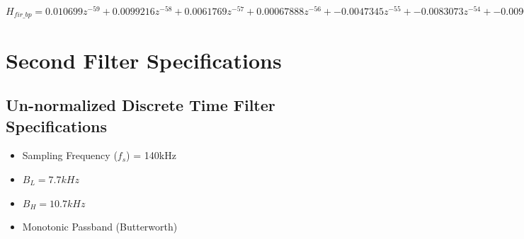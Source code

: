 \documentclass[22pt]{article}
\begin{document}
$H_{fir\_bp} = 0.010699z^{-59} +0.0099216z^{-58} +0.0061769z^{-57} +0.00067888z^{-56} +-0.0047345z^{-55} +-0.0083073z^{-54} +-0.0090412z^{-53} +-0.0070586z^{-52} +-0.0035005z^{-51} +1.5549e-17z^{-50} +0.0020437z^{-49} +0.0020753z^{-48} +0.0006074z^{-47} +-0.0010474z^{-46} +-0.0014292z^{-45} +0.00031922z^{-44} +0.0039434z^{-43} +0.0080615z^{-42} +0.010683z^{-41} +0.010067z^{-40} +0.0055652z^{-39} +-0.0019308z^{-38} +-0.010166z^{-37} +-0.016293z^{-36} +-0.017965z^{-35} +-0.014297z^{-34} +-0.0062993z^{-33} +0.0034278z^{-32} +0.011658z^{-31} +0.015779z^{-30} +0.014805z^{-29} +0.009742z^{-28} +0.0031172z^{-27} +-0.0021396z^{-26} +-0.0040068z^{-25} +-0.0023031z^{-24} +0.0011925z^{-23} +0.003537z^{-22} +0.0020435z^{-21} +-0.0042678z^{-20} +-0.013846z^{-19} +-0.022858z^{-18} +-0.026534z^{-17} +-0.021167z^{-16} +-0.0059818z^{-15} +0.01592z^{-14} +0.038073z^{-13} +0.05258z^{-12} +0.052901z^{-11} +0.036481z^{-10} +0.0062323z^{-9} +-0.029837z^{-8} +-0.060854z^{-7} +-0.07654z^{-6} +-0.070733z^{-5} +-0.04374z^{-4} +-0.0026197z^{-3} +0.040796z^{-2} +0.073555z^{-1} +0.085714z^{0} +0.073555z^{1} +0.040796z^{2} +-0.0026197z^{3} +-0.04374z^{4} +-0.070733z^{5} +-0.07654z^{6} +-0.060854z^{7} +-0.029837z^{8} +0.0062323z^{9} +0.036481z^{10} +0.052901z^{11} +0.05258z^{12} +0.038073z^{13} +0.01592z^{14} +-0.0059818z^{15} +-0.021167z^{16} +-0.026534z^{17} +-0.022858z^{18} +-0.013846z^{19} +-0.0042678z^{20} +0.0020435z^{21} +0.003537z^{22} +0.0011925z^{23} +-0.0023031z^{24} +-0.0040068z^{25} +-0.0021396z^{26} +0.0031172z^{27} +0.009742z^{28} +0.014805z^{29} +0.015779z^{30} +0.011658z^{31} +0.0034278z^{32} +-0.0062993z^{33} +-0.014297z^{34} +-0.017965z^{35} +-0.016293z^{36} +-0.010166z^{37} +-0.0019308z^{38} +0.0055652z^{39} +0.010067z^{40} +0.010683z^{41} +0.0080615z^{42} +0.0039434z^{43} +0.00031922z^{44} +-0.0014292z^{45} +-0.0010474z^{46} +0.0006074z^{47} +0.0020753z^{48} +0.0020437z^{49} +1.5549e-17z^{50} +-0.0035005z^{51} +-0.0070586z^{52} +-0.0090412z^{53} +-0.0083073z^{54} +-0.0047345z^{55} +0.00067888z^{56} +0.0061769z^{57} +0.0099216z^{58} +0.010699z^{59}$



\section{Second Filter Specifications}
\subsection{Un-normalized Discrete Time Filter Specifications}
\begin{itemize}
\item Sampling Frequency ($f_s$) = 140kHz
\item $B_L = 7.7 kHz$
\item $B_H = 10.7 kHz$
\item Monotonic Passband (Butterworth)
\end{itemize}
\end{document}
